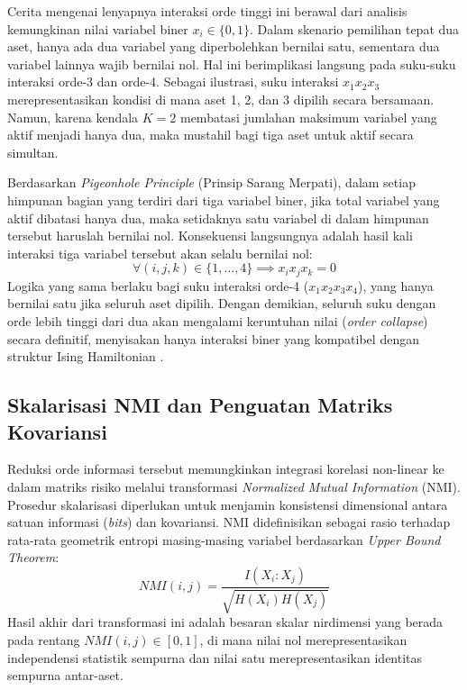 Cerita mengenai lenyapnya interaksi orde tinggi ini berawal dari analisis kemungkinan nilai variabel biner $x_i \in \{0, 1\}$. Dalam skenario pemilihan tepat dua aset, hanya ada dua variabel yang diperbolehkan bernilai satu, sementara dua variabel lainnya wajib bernilai nol. Hal ini berimplikasi langsung pada suku-suku interaksi orde-3 dan orde-4. Sebagai ilustrasi, suku interaksi $x_1 x_2 x_3$ merepresentasikan kondisi di mana aset 1, 2, dan 3 dipilih secara bersamaan. Namun, karena kendala $K=2$ membatasi jumlahan maksimum variabel yang aktif menjadi hanya dua, maka mustahil bagi tiga aset untuk aktif secara simultan.

Berdasarkan \textit{Pigeonhole Principle} (Prinsip Sarang Merpati), dalam setiap himpunan bagian yang terdiri dari tiga variabel biner, jika total variabel yang aktif dibatasi hanya dua, maka setidaknya satu variabel di dalam himpunan tersebut haruslah bernilai nol. Konsekuensi langsungnya adalah hasil kali interaksi tiga variabel tersebut akan selalu bernilai nol:
\begin{equation}
\forall (i, j, k) \in \{1, \dots, 4\} \implies x_i x_j x_k = 0
\label{eq:proof_order_3}
\end{equation}
Logika yang sama berlaku bagi suku interaksi orde-4 ($x_1 x_2 x_3 x_4$), yang hanya bernilai satu jika seluruh aset dipilih. Dengan demikian, seluruh suku dengan orde lebih tinggi dari dua akan mengalami keruntuhan nilai (\textit{order collapse}) secara definitif, menyisakan hanya interaksi biner yang kompatibel dengan struktur Ising Hamiltonian \cite{menezes_ex_2025}.

\subsection{Skalarisasi NMI dan Penguatan Matriks Kovariansi}

Reduksi orde informasi tersebut memungkinkan integrasi korelasi non-linear ke dalam matriks risiko melalui transformasi \textit{Normalized Mutual Information} (NMI). Prosedur skalarisasi diperlukan untuk menjamin konsistensi dimensional antara satuan informasi (\textit{bits}) dan kovariansi. NMI didefinisikan sebagai rasio terhadap rata-rata geometrik entropi masing-masing variabel berdasarkan \textit{Upper Bound Theorem}:
\begin{equation}
NMI(i, j) = \frac{I(X_i : X_j)}{\sqrt{H(X_i)H(X_j)}}
\label{eq:nmi_definition}
\end{equation}
Hasil akhir dari transformasi ini adalah besaran skalar nirdimensi yang berada pada rentang $NMI(i, j) \in [0, 1]$, di mana nilai nol merepresentasikan independensi statistik sempurna dan nilai satu merepresentasikan identitas sempurna antar-aset.


